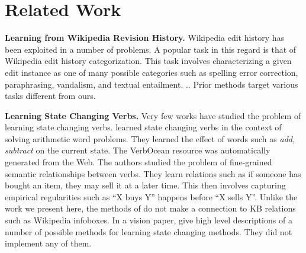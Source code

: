 \section{Related Work}

\textbf{Learning from Wikipedia Revision History.}
Wikipedia edit history has been exploited in a number of problems.
  A popular task in this regard is that of
Wikipedia edit history categorization\cite{daxenberger2013automatically}.  This task
involves characterizing  a given edit instance as one of many possible categories 
such as spelling error correction, paraphrasing, vandalism,  and textual entailment. \cite{Nelken08miningwikipedia,Cahill13robustsystems,Zanzotto_expandingtextual,RecasensDJ13}.. 
Prior methods target various tasks different from ours.

\textbf{Learning State Changing Verbs.}
Very few works have studied the problem of learning state changing verbs.
\cite{HosseiniHEK14} learned state changing verbs in the context of solving arithmetic word problems.
They learned the effect of  words such as \textit{add, subtract} on  the current state. 
The VerbOcean resource was automatically generated from the Web\cite{Chklovski04}. The authors  studied the problem of fine-grained semantic relationships between verbs. They learn relations such as  if someone has bought an item, they may sell it at a later time. This then involves capturing empirical regularities such as  ``X buys Y'' happens before ``X
sells Y''. Unlike the work we present here, the methods of \cite{Chklovski04,HosseiniHEK14}  do not make a connection to KB relations such as Wikipedia infoboxes.
In a vision paper, \cite{Wijaya2014akbc} give high level descriptions of  a number of possible methods for learning state changing methods. They  did not implement any of them.
